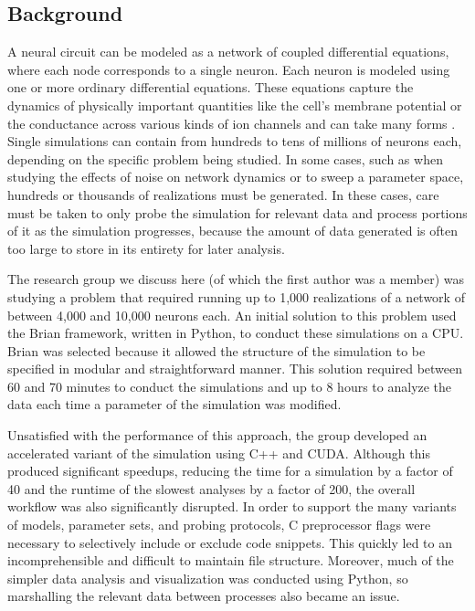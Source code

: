 \documentclass[10pt, conference, compsocconf]{IEEEtran}
\begin{document}
\subsection{Background}
A neural circuit can be modeled as a network of coupled differential equations, where each node corresponds to a single neuron. Each neuron is modeled using one or more ordinary differential equations. These equations capture the dynamics of physically important quantities like the cell's membrane potential or the conductance across various kinds of ion channels and can take many forms \cite{neurobook}. Single simulations can contain from hundreds to tens of millions of neurons each, depending on the specific problem being studied. In some cases, such as when studying the effects of noise on network dynamics or to sweep a parameter space, hundreds or thousands of realizations must be generated. In these cases, care must be taken to only probe the simulation for relevant data and process portions of it as the simulation progresses, because the amount of data generated is often too large to store in its entirety for later analysis.

The research group we discuss here (of which the first author was a member) was studying a problem that required running up to 1,000 realizations of a network of between 4,000 and 10,000 neurons each. An initial solution to this problem used the Brian framework, written in Python, to conduct these simulations on a CPU. Brian was selected because it allowed the structure of the  simulation to be specified in modular and straightforward manner. This solution required between 60 and 70 minutes to conduct the simulations and up to 8 hours to analyze the data each time a parameter of the simulation was modified.

Unsatisfied with the performance of this approach, the group developed an accelerated variant of the simulation using C++ and CUDA. Although this produced significant speedups, reducing the time for a simulation by a factor of 40 and the runtime of the slowest analyses by a factor of 200, the overall workflow was also significantly disrupted. In order to support the many variants of models, parameter sets, and probing protocols, C preprocessor flags were necessary to selectively include or exclude code snippets. This quickly led to an incomprehensible and difficult to maintain file structure. Moreover, much of the simpler data analysis and visualization was conducted using Python, so marshalling the relevant data between processes also became an issue. 
\end{document}
